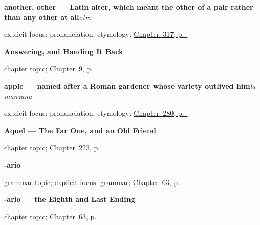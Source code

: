 \noindent\begin{minipage}[t]{\linewidth}
\raggedright
\textbf{another, other — Latin alter, which meant the other of a pair rather than any other at all}\enspace\emph{otro}\par
\footnotesize explicit focus: pronunciation, etymology; \hyperref[ch:algo-y-nadie]{Chapter~317, p.~\pageref*{ch:algo-y-nadie}}
\end{minipage}\par\smallskip

\noindent\begin{minipage}[t]{\linewidth}
\raggedright
\textbf{Answering, and Handing It Back}\par
\footnotesize chapter topic; \hyperref[ch:answering]{Chapter~9, p.~\pageref*{ch:answering}}
\end{minipage}\par\smallskip

\noindent\begin{minipage}[t]{\linewidth}
\raggedright
\textbf{apple — named after a Roman gardener whose variety outlived him}\enspace\emph{la manzana}\par
\footnotesize explicit focus: pronunciation, etymology; \hyperref[ch:la-compra]{Chapter~280, p.~\pageref*{ch:la-compra}}
\end{minipage}\par\smallskip

\noindent\begin{minipage}[t]{\linewidth}
\raggedright
\textbf{Aquel --- The Far One, and an Old Friend}\par
\footnotesize chapter topic; \hyperref[ch:aquel]{Chapter~223, p.~\pageref*{ch:aquel}}
\end{minipage}\par\smallskip

\noindent\begin{minipage}[t]{\linewidth}
\raggedright
\textbf{-ario}\par
\footnotesize grammar topic; explicit focus: grammar; \hyperref[ch:ario]{Chapter~63, p.~\pageref*{ch:ario}}
\end{minipage}\par\smallskip

\noindent\begin{minipage}[t]{\linewidth}
\raggedright
\textbf{-ario --- the Eighth and Last Ending}\par
\footnotesize chapter topic; \hyperref[ch:ario]{Chapter~63, p.~\pageref*{ch:ario}}
\end{minipage}\par\smallskip

